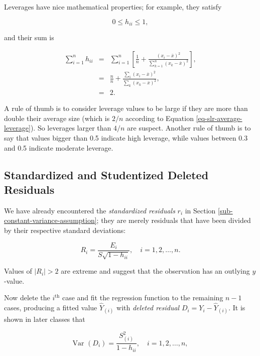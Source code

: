 \documentclass[]{book}
\numberwithin{equation}{chapter}
\numberwithin{figure}{chapter}
\theoremstyle{plain}
\theoremstyle{definition}
\theoremstyle{remark}
\theoremstyle{definition}
\theoremstyle{definition}
\theoremstyle{remark}
\begin{document}
Leverages have nice mathematical properties; for example, they satisfy

\begin{equation}
\label{eq-slr-leverage-between}
0\leq h_{ii}\leq1,
\end{equation}

and their sum is

\begin{eqnarray}
\label{eq-slr-average-leverage}
\sum_{i=1}^{n}h_{ii} & = & \sum_{i=1}^{n}\left[\frac{1}{n}+\frac{(x_{i}-\overline{x})^{2}}{\sum_{k=1}^{n}(x_{k}-\overline{x})^{2}}\right],\\
 & = & \frac{n}{n}+\frac{\sum_{i}(x_{i}-\overline{x})^{2}}{\sum_{k}(x_{k}-\overline{x})^{2}},\\
 & = & 2.
\end{eqnarray}

A rule of thumb is to consider leverage values to be large if they are
more than double their average size (which is \(2/n\) according to
Equation \eqref{eq-slr-average-leverage}). So leverages larger than
\(4/n\) are suspect. Another rule of thumb is to say that values bigger
than 0.5 indicate high leverage, while values between 0.3 and 0.5
indicate moderate leverage.

\subsection{Standardized and Studentized Deleted
Residuals}\label{standardized-and-studentized-deleted-residuals}

We have already encountered the \emph{standardized residuals} \(r_{i}\)
in Section \ref{sub-constant-variance-assumption}; they are merely
residuals that have been divided by their respective standard
deviations:

\begin{equation}
R_{i}=\frac{E_{i}}{S\sqrt{1-h_{ii}}},\quad i=1,2,\ldots,n.
\end{equation}

Values of \(|R_{i}| > 2\) are extreme and suggest that the observation
has an outlying \(y\)-value.

Now delete the \(i^{\mathrm{th}}\) case and fit the regression function
to the remaining \(n - 1\) cases, producing a fitted value
\(\hat{Y}_{(i)}\) with \emph{deleted residual}
\(D_{i}=Y_{i}-\hat{Y}_{(i)}\). It is shown in later classes that

\begin{equation}
\mbox{Var $(D_{i})$}=\frac{S_{(i)}^{2}}{1-h_{ii}},\quad i=1,2,\ldots,n,
\end{equation}
\end{document}
